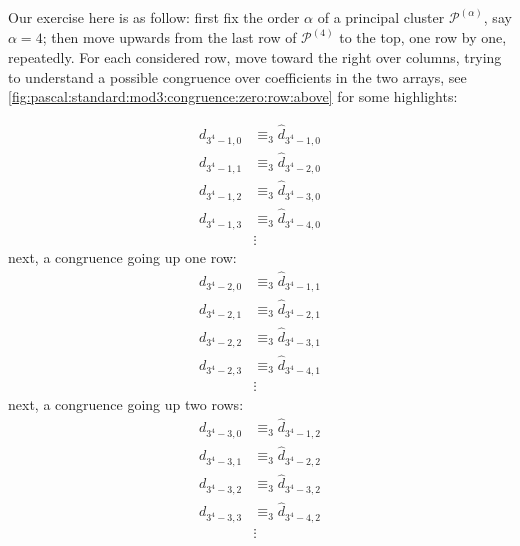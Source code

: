 Our exercise here is as follow: first fix the order $\alpha$ of a principal
cluster $\mathcal{P}^{(\alpha)}$, say $\alpha=4$; then move upwards from the
last row of $\mathcal{P}^{(4)}$ to the top, one row by one, repeatedly. For
each considered row, move toward the right over columns, trying to understand a
possible congruence over coefficients in the two arrays, see
\autoref{fig:pascal:standard:mod3:congruence:zero:row:above}
for some highlights:

\begin{displaymath}
    \begin{split}
        d_{3^4 -1,0} &\equiv_{3} \hat{d}_{3^4 -1,0} \\
        d_{3^4 -1,1} &\equiv_{3} \hat{d}_{3^4 -2,0} \\
        d_{3^4 -1,2} &\equiv_{3} \hat{d}_{3^4 -3,0} \\
        d_{3^4 -1,3} &\equiv_{3} \hat{d}_{3^4 -4,0} \\
        &\vdots
    \end{split}
\end{displaymath}
next, a congruence going up one row:
\begin{displaymath}
    \begin{split}
        d_{3^4 -2,0} &\equiv_{3} \hat{d}_{3^4 -1,1} \\
        d_{3^4 -2,1} &\equiv_{3} \hat{d}_{3^4 -2,1} \\
        d_{3^4 -2,2} &\equiv_{3} \hat{d}_{3^4 -3,1} \\
        d_{3^4 -2,3} &\equiv_{3} \hat{d}_{3^4 -4,1} \\
        &\vdots
    \end{split}
\end{displaymath}
next, a congruence going up two rows:
\begin{displaymath}
    \begin{split}
        d_{3^4 -3,0} &\equiv_{3} \hat{d}_{3^4 -1,2} \\
        d_{3^4 -3,1} &\equiv_{3} \hat{d}_{3^4 -2,2} \\
        d_{3^4 -3,2} &\equiv_{3} \hat{d}_{3^4 -3,2} \\
        d_{3^4 -3,3} &\equiv_{3} \hat{d}_{3^4 -4,2} \\
        &\vdots
    \end{split}
\end{displaymath}

